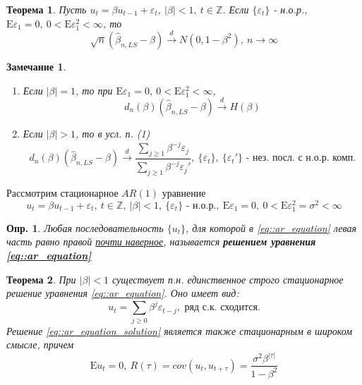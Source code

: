 \documentclass[12pt]{article}
\newtheorem{definition}{Опр.}
\newtheorem{theorem}{Теорема}
\newtheorem*{remark*}{Замечание}
\newcommand\defin[1]{\textbf{#1}}
\def\eps{ \varepsilon }
\def\Z{ \mathbb{Z} }
\def\E{ \mathrm{E} }
\begin{document}
\begin{theorem}
    Пусть $u_t=\beta u_{t-1}+\eps_t,\ \left\lvert \beta\right\rvert <1,\ t\in\Z$. Если $\{\eps_t\}$ - н.о.р.,
    $\E\eps_1=0,\ 0<\E\eps_1^2<\infty$, то
    \[\sqrt{n}(\widehat{\beta}_{n,LS}-\beta)\xrightarrow{d}N(0,1-\beta^2),\ n\rightarrow\infty\]
\end{theorem}
\begin{remark*}
    \begin{enumerate}
        \item Если $\left\lvert \beta\right\rvert =1$, то при $\E\eps_1=0,\ 0<\E\eps_1^2<\infty$,
        \[d_n(\beta)(\widehat{\beta}_{n,LS}-\beta)\xrightarrow{d}H(\beta)\]
        \item Если $\left\lvert \beta\right\rvert >1$, то в усл. п. (1)
        \[d_n(\beta)(\widehat{\beta}_{n,LS}-\beta)\xrightarrow{d}\frac{\sum_{j\geq1}\beta^{-j}\eps_j}{\sum_{j\geq1}\beta^{-j}\eps_j'},\ \{\eps_t\},\ \{\eps_t'\}\text{ - нез. посл. с н.о.р. комп.}\]
    \end{enumerate}
\end{remark*}
Рассмотрим стационарное $AR(1)$ уравнение
\begin{equation}\label{eq::ar_equation}
    u_t=\beta u_{t-1}+\eps_t,\ t\in\Z,\ \left\lvert \beta\right\rvert <1,\ \{\eps_t\}\text{ - н.о.р.},\ \E\eps_1=0,\ 0<\E\eps_1^2=\sigma^2<\infty
\end{equation}
\begin{definition}
    Любая последовательность $\{u_t\}$, для которой в \eqref{eq::ar_equation} левая часть
    равно правой \underline{почти наверное}, называется \defin{решением уравнения \eqref{eq::ar_equation}}
\end{definition}
\begin{theorem}
    При $\left\lvert \beta\right\rvert <1$ существует п.н. единственное строго стационарное решение уравнения \eqref{eq::ar_equation}.
    Оно имеет вид:
    \begin{equation}\label{eq::ar_equation_solution}
        u_t=\sum_{j\geq0}\beta^j\eps_{t-j},\text{ ряд с.к. сходится.}
    \end{equation}
    Решение \eqref{eq::ar_equation_solution} является также стационарным в широком смысле,
    причем
    \[\E u_t=0,\ R(\tau)=cov(u_t,u_{t+\tau})=\frac{\sigma^2\beta^{\left\lvert \tau\right\rvert }}{1-\beta^2}\]
\end{theorem}
\end{document}
